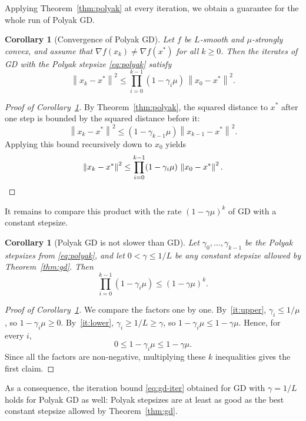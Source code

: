 \documentclass[11pt]{article}
\newtheorem{corollary}[theorem]{Corollary}
\newcommand{\norm}[1]{\left\| #1 \right\|}
\begin{document}
Applying Theorem~\ref{thm:polyak} at every iteration, we obtain a guarantee for the whole
run of Polyak GD.

\begin{corollary}[Convergence of Polyak GD]\label{cor:polyak-conv}
Let $f$ be $L$-smooth and $\mu$-strongly convex, and assume that $\nabla f(x_k) \neq \nabla f(x^*)$
for all $k \geq 0$. Then the iterates of GD with the Polyak stepsize \eqref{eq:polyak} satisfy
\[
\norm{x_k-x^*}^2 \leq \prod_{i=0}^{k-1}(1-\gamma_i\mu)\,\norm{x_0-x^*}^2.
\]
\end{corollary}

\begin{proof}[Proof of Corollary~\ref{cor:polyak-conv}]
By Theorem~\ref{thm:polyak}, the squared distance to $x^*$ after one step is bounded by the squared distance before it:
\[
\norm{x_k - x^*}^2 \leq (1 - \gamma_{k-1}\mu)\norm{x_{k-1} - x^*}^2.
\]
Applying this bound recursively down to $x_0$ yields
\[
\norm{x_k - x^*}^2 \leq \prod_{i=0}^{k-1} (1 - \gamma_i\mu)\, \norm{x_0 - x^*}^2. \qedhere
\]
\end{proof}

It remains to compare this product with the rate $(1-\gamma\mu)^k$ of GD with a constant stepsize.

\begin{corollary}[Polyak GD is not slower than GD]\label{cor:gd-vs-polyak}
Let $\gamma_0, \dots, \gamma_{k-1}$ be the Polyak stepsizes from \eqref{eq:polyak}, and let
$0 < \gamma \leq 1/L$ be any constant stepsize allowed by Theorem~\ref{thm:gd}. Then
\[
\prod_{i=0}^{k-1}(1-\gamma_i\mu) \leq (1-\gamma\mu)^k.
\]
\end{corollary}

\begin{proof}[Proof of Corollary~\ref{cor:gd-vs-polyak}]
We compare the factors one by one. By~\ref{it:upper}, $\gamma_i \leq 1/\mu$, so $1-\gamma_i\mu \geq 0$.
By~\ref{it:lower}, $\gamma_i \geq 1/L \geq \gamma$, so $1-\gamma_i\mu \leq 1-\gamma\mu$. Hence, for every $i$,
\[
0 \leq 1-\gamma_i\mu \leq 1-\gamma\mu.
\]
Since all the factors are non-negative, multiplying these $k$ inequalities gives the first claim.
\end{proof}

As a consequence, the iteration bound \eqref{eq:gd-iter} obtained for GD with $\gamma = 1/L$
holds for Polyak GD as well: Polyak stepsizes are at least as good as the best constant stepsize
allowed by Theorem~\ref{thm:gd}.
\end{document}
